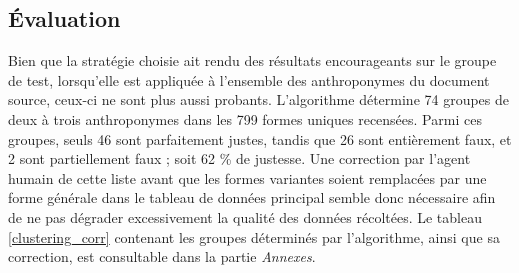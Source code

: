 \subsection{Évaluation}
Bien que la stratégie choisie ait rendu des résultats encourageants sur le groupe de test, lorsqu'elle est appliquée à l'ensemble des anthroponymes du document source, ceux-ci ne sont plus aussi probants. L'algorithme détermine 74 groupes de deux à trois anthroponymes dans les 799 formes uniques recensées. Parmi ces groupes, seuls 46 sont parfaitement justes, tandis que 26 sont entièrement faux, et 2 sont partiellement faux ; soit 62 \% de justesse. Une correction par l'agent humain de cette liste avant que les formes variantes soient remplacées par une forme générale dans le tableau de données principal semble donc nécessaire afin de ne pas dégrader excessivement la qualité des données récoltées.
Le tableau \ref{clustering_corr} contenant les groupes déterminés par l'algorithme, ainsi que sa correction, est consultable dans la partie \textit{Annexes}.


